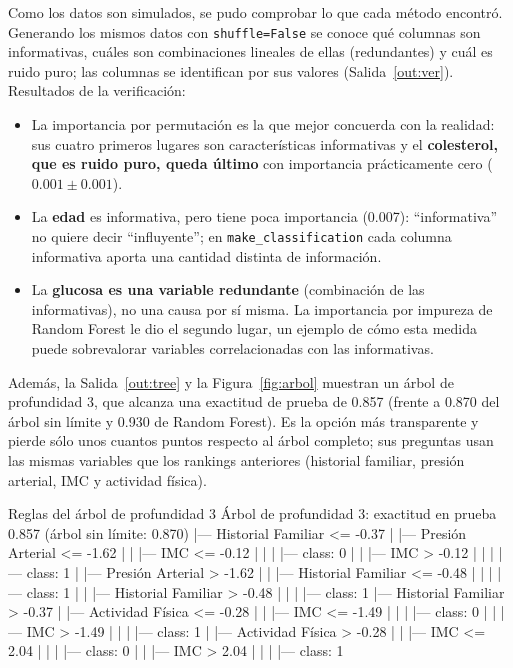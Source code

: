 \documentclass[11pt,letterpaper]{article}
\begin{document}
Como los datos son simulados, se pudo comprobar lo que cada método encontró. Generando los mismos datos con \texttt{shuffle=False} se conoce qué columnas son informativas, cuáles son combinaciones lineales de ellas (redundantes) y cuál es ruido puro; las columnas se identifican por sus valores (Salida~\ref{out:ver}). Resultados de la verificación:
\begin{itemize}
    \item La importancia por permutación es la que mejor concuerda con la realidad: sus cuatro primeros lugares son características informativas y el \textbf{colesterol, que es ruido puro, queda último} con importancia prácticamente cero ($0.001\pm0.001$).
    \item La \textbf{edad} es informativa, pero tiene poca importancia (0.007): ``informativa'' no quiere decir ``influyente''; en \texttt{make\_classification} cada columna informativa aporta una cantidad distinta de información.
    \item La \textbf{glucosa es una variable redundante} (combinación de las informativas), no una causa por sí misma. La importancia por impureza de Random Forest le dio el segundo lugar, un ejemplo de cómo esta medida puede sobrevalorar variables correlacionadas con las informativas.
\end{itemize}

Además, la Salida~\ref{out:tree} y la Figura~\ref{fig:arbol} muestran un árbol de profundidad 3, que alcanza una exactitud de prueba de 0.857 (frente a 0.870 del árbol sin límite y 0.930 de Random Forest). Es la opción más transparente y pierde sólo unos cuantos puntos respecto al árbol completo; sus preguntas usan las mismas variables que los rankings anteriores (historial familiar, presión arterial, IMC y actividad física).

\begin{consola}[label=out:tree]{Reglas del árbol de profundidad 3}
Árbol de profundidad 3: exactitud en prueba 0.857 (árbol sin límite: 0.870)
|--- Historial Familiar <= -0.37
|   |--- Presión Arterial <= -1.62
|   |   |--- IMC <= -0.12
|   |   |   |--- class: 0
|   |   |--- IMC >  -0.12
|   |   |   |--- class: 1
|   |--- Presión Arterial >  -1.62
|   |   |--- Historial Familiar <= -0.48
|   |   |   |--- class: 1
|   |   |--- Historial Familiar >  -0.48
|   |   |   |--- class: 1
|--- Historial Familiar >  -0.37
|   |--- Actividad Física <= -0.28
|   |   |--- IMC <= -1.49
|   |   |   |--- class: 0
|   |   |--- IMC >  -1.49
|   |   |   |--- class: 1
|   |--- Actividad Física >  -0.28
|   |   |--- IMC <= 2.04
|   |   |   |--- class: 0
|   |   |--- IMC >  2.04
|   |   |   |--- class: 1
\end{consola}
\end{document}
